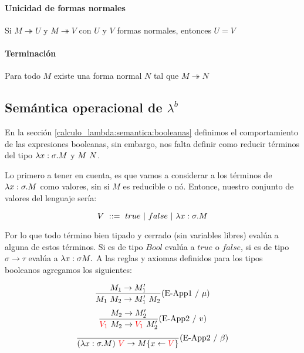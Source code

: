 \paragraph{Unicidad de formas normales} Si $M\twoheadrightarrow U$ y $M\twoheadrightarrow V$ con $U$ y $V$ formas normales, entonces $U = V$

\paragraph{Terminación}
Para todo $M$ existe una forma normal $N$ tal que $M\twoheadrightarrow N$


\subsection{Semántica operacional de \texorpdfstring{$\lambda^b$}{lambda b}}
En la sección \ref{calculo_lambda:semantica:booleanas} definimos el comportamiento de las expresiones booleanas, sin embargo, nos falta definir como reducir términos del tipo $\lambda x: \sigma . M$ y $M~N$.

Lo primero a tener en cuenta, es que vamos a considerar a los términos de $\lambda x: \sigma . M$ como valores, sin si $M$ es reducible o nó. Entonce, nuestro conjunto de valores del lenguaje sería:

$$ V  ~::=~ true~|~false~|~\lambda x: \sigma . M$$

Por lo que todo término bien tipado y cerrado (sin variables libres) evalúa a alguna de estos términos. Si es de tipo $Bool$ evalúa a $true$ o $false$, si es de tipo $\sigma\to\tau$ evalúa a $\lambdaAbs{x}{\sigma{M}}$
A las reglas y axiomas definidos para los tipos booleanos agregamos los siguientes:

\begin{equation*}
\frac{M_1\to M'_1}{M_1~M_2 \to 
M'_1~M_2}(\text{E-App1}~ /~ \mu)
\end{equation*}
\vspace*{5mm}
\begin{equation*}
\frac{M_2 \to M'_2}{\color{red}V_1\color{black}~M_2 \to 
	\color{red}V_1\color{black}~M'_2}(\text{E-App2}~/~v)
\end{equation*}	
\vspace*{5mm}
\begin{equation*}
\frac{}{(\lambda x: \sigma . M)~\color{red}V\color{black} \to 
	M\{x\leftarrow\color{red}V\color{black}\}}(\text{E-App2}~/~\beta)
\end{equation*}

